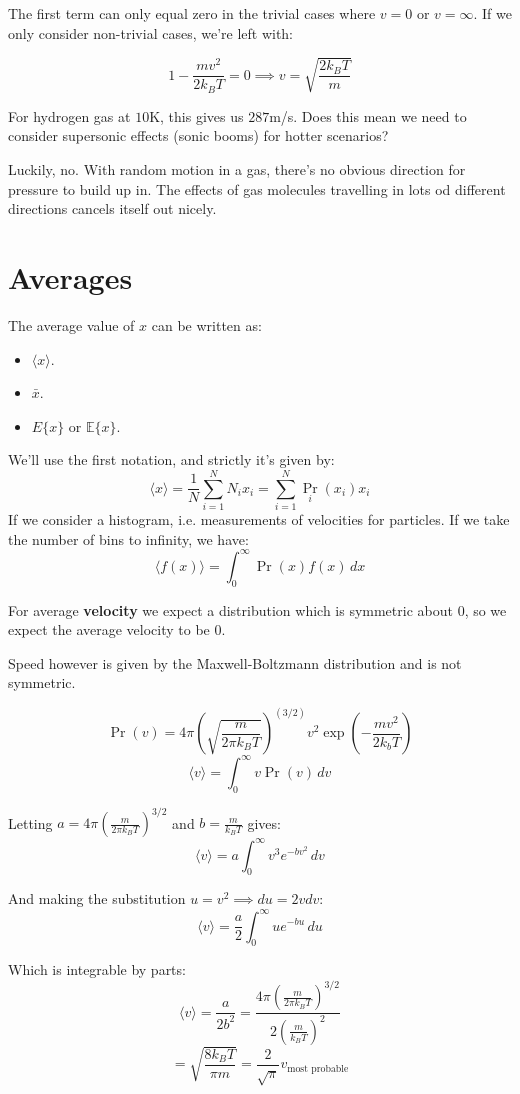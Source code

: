 The first term can only equal zero in the trivial cases where $v = 0$ or $v = \infty$. If we only consider non-trivial cases, we're left with:

\[
    1 - \frac{mv^2}{2k_B T} = 0 \implies v = \sqrt{\frac{2 k_B T}{m}}
\]

For hydrogen gas at $10$K, this gives us $287$m/s. Does this mean we need to consider supersonic effects (sonic booms) for hotter scenarios?

Luckily, no. With random motion in a gas, there's no obvious direction for pressure to build up in. The effects of gas molecules travelling in lots od different directions cancels itself out nicely.

\section{Averages}
The average value of $x$ can be written as:
\begin{itemize}
    \item $\langle x\rangle$.
    \item $\bar{x}$.
    \item $E\{x\}$ or $\mathbb{E} \{x\}$.
\end{itemize}

We'll use the first notation, and strictly it's given by:
\[
    \langle x\rangle = \frac{1}{N} \sum_{i=1}^{N} N_i x_i = \sum_{i=1}^{N} \Pr_i(x_i) x_i
\]
If we consider a histogram, i.e. measurements of velocities for particles. If we take the number of bins to infinity, we have:
\[
    \langle f(x)\rangle = \int_{0}^{\infty} \Pr(x) f(x) \, dx
\]

For average \textbf{velocity} we expect a distribution which is symmetric about $0$, so we expect the average velocity to be $0$.

Speed however is given by the Maxwell-Boltzmann distribution and is not symmetric.

\[
    \Pr(v) = 4 \pi \left(\sqrt{\frac{m}{2 \pi k_B T}}\right)^{(3/2)} v^2 \exp\left(- \frac{mv^2}{2 k_b T}\right)
\]
\[
    \langle v\rangle = \int_{0}^{\infty} v \Pr(v) \, dv
\]

Letting $a = 4 \pi \left(\frac{m}{2 \pi k_B T}\right)^{3/2}$ and $b = \frac{m}{k_B T}$ gives:
\[
    \langle v\rangle = a \int_{0}^{\infty} v^3 e^{-bv^2} \, dv
\]

And making the substitution $u = v^2 \implies du = 2v dv$:
\[
    \langle v\rangle = \frac{a}{2}\int_{0}^{\infty} u e^{-bu} \, du
\]

Which is integrable by parts:
\[
    \langle v\rangle = \frac{a}{2b^2} = \frac{4 \pi \left(\frac{m}{2 \pi k_B T}\right)^{3/2}}{2 \left(\frac{m}{k_B T}\right)^2}
\]
\[
    = \sqrt{\frac{8 k_B T}{\pi m}} = \frac{2}{\sqrt{\pi}} v_\text{most probable}
\]

